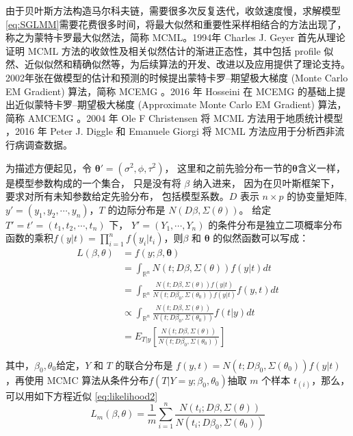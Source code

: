 \documentclass[hyperref, a4paper, UTF8, zihao = -4, linespread = 1.25, scheme = chinese]{ctexbook}
\begin{document}
由于贝叶斯方法构造马尔科夫链，需要很多次反复迭代，收敛速度慢，求解模型\eqref{eq:SGLMM}需要花费很多时间，将最大似然和重要性采样相结合的方法出现了，称之为蒙特卡罗最大似然法，简称
MCML。1994年 Charles J. Geyer 首先从理论证明 MCML
方法的收敛性及相关似然估计的渐进正态性，其中包括 profile
似然、近似似然和精确似然等，为后续算法的开发、改进以及应用提供了理论支持\citep{Geyer1994On}。2002年张在做模型的估计和预测的时候提出蒙特卡罗--期望极大梯度
(Monte Carlo EM Gradient) 算法，简称 MCEMG \citep{Zhang2002On}。2016 年
Hosseini 在 MCEMG 的基础上提出近似蒙特卡罗--期望极大梯度 (Approximate
Monte Carlo EM Gradient) 算法，简称 AMCEMG \citep{Hosseini2016}。2004 年
Ole F Christensen 将 MCML 方法用于地质统计模型
\citep{Christensen2004}，2016 年 Peter J. Diggle 和 Emanuele Giorgi 将
MCML 方法应用于分析西非流行病调查数据。

为描述方便起见，令 \(\bm{\theta}' = (\sigma^2,\phi,\tau^2)\)，
这里和之前先验分布一节的\(\bm{\theta}\)含义一样，
是模型参数构成的一个集合， 只是没有将 \(\beta\) 纳入进来，
因为在贝叶斯框架下， 要求对所有未知参数给定先验分布，
包括模型系数。\(D\) 表示 \(n\times p\) 的协变量矩阵,
\(y' = (y_1,y_2,\cdots,y_n)\)，\(T\) 的边际分布是
\(N(D\beta,\Sigma(\theta))\)。 给定 \(T'=t'=(t_1,t_2,\cdots,t_n)\) 下，
\(Y'=(Y_1,\cdots,Y_n)\)
的条件分布是独立二项概率分布函数的乘积\(f(y|t)=\prod_{i=1}^{n}f(y_{i}|t_{i})\)，则\(\beta\)
和 \(\bm{\theta}\) 的似然函数可以写成：\begin{equation}
\begin{aligned}
L(\beta,\theta)
& = f(y;\beta,\bm{\theta}) \\
& = \int_{\mathbb{R}^{n}} N(t;D\beta,\Sigma(\theta))f(y|t)dt\\
& = \int_{\mathbb{R}^{n}} \frac{N(t;D\beta,\Sigma(\theta))f(y|t)}{N(t;D\beta_{0},\Sigma(\theta_{0}))f(y|t)}f(y,t)dt\\
& \varpropto \int_{\mathbb{R}^{n}} \frac{N(t;D\beta,\Sigma(\theta))}{N(t;D\beta_{0},\Sigma(\theta_{0}))}f(t|y)dt \\
&= E_{T|y}\left[\frac{N(t;D\beta,\Sigma(\theta))}{N(t;D\beta_{0},\Sigma(\theta_{0}))}\right] \label{eq:likelihood2}
\end{aligned}
\end{equation}

其中，\(\beta_{0},\theta_{0}\)给定，\(Y\) 和 \(T\) 的联合分布是
\(f(y,t)=N(t;D\beta_{0},\Sigma(\theta_{0}))f(y|t)\)，再使用 MCMC
算法从条件分布\(f(T|Y=y;\beta_0,\theta_0)\)抽取 \(m\) 个样本
\(t_{(i)}\)，那么，可以用如下方程近似 \eqref{eq:likelihood2}
\begin{equation}
L_{m}(\beta,\theta)=\frac{1}{m}\sum_{i=1}^{n}\frac{N(t_{i};D\beta,\Sigma(\theta))}{N(t_{i};D\beta_{0},\Sigma(\theta_{0}))} \label{eq:likelihood-approx}
\end{equation}
\end{document}
